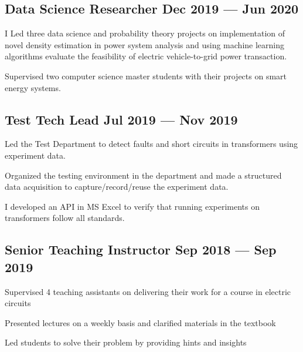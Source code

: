 \documentclass[letter,10pt]{article}
\begin{document}
\subsection{{Data Science Researcher \hfill Dec 2019 --- Jun 2020}}
\begin{zitemize}
\item I Led three data science and probability theory projects on implementation of novel density estimation in power system analysis and using machine learning algorithms evaluate the feasibility of electric vehicle-to-grid power transaction.
\item Supervised two computer science master students with their projects on smart energy systems.
\end{zitemize}

\subsection{{Test Tech Lead \hfill Jul 2019 --- Nov 2019}}
\begin{zitemize}
\item Led the Test Department to detect faults and short circuits in transformers using experiment data.
\item Organized the testing environment in the department and made a structured data acquisition to capture/record/reuse the experiment data.
\item I developed an API in MS Excel to verify that running experiments on transformers follow all standards.
\end{zitemize}

\subsection{Senior Teaching Instructor \hfill Sep 2018 --- Sep 2019}
\begin{zitemize}
	\item Supervised 4 teaching assistants on delivering their work for a course in electric circuits
	\item Presented lectures on a weekly basis and clarified materials in the textbook
	\item Led students to solve their problem by providing hints and insights
\end{zitemize}
\end{document}
